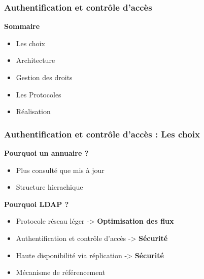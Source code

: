 \begin{frame}
  \frametitle{Authentification et contrôle d'accès}
  \begin{block}{\textbf{ Sommaire }}
  \begin{itemize}
  \item Les choix
  \item Architecture
  \item Gestion des droits
  \item Les Protocoles
  \item Réalisation
  \end{itemize}
  \end{block}
\end{frame}

\begin{frame}
  \frametitle{Authentification et contrôle d'accès : Les choix}
  \begin{block}{\textbf{Pourquoi un annuaire ? }}
  \begin{itemize}
  \item Plus consulté que mis à jour
  \item Structure hierachique 
  \end{itemize} 
  \end{block}
  
  \begin{block}{\textbf{Pourquoi LDAP ? }}
  \begin{itemize}
  \item Protocole réseau léger -> \textbf{Optimisation des flux
}
  \item Authentification et contrôle d'accès -> \textbf{Sécurité}
  \item Haute disponibilité via réplication  -> \textbf{Sécurité}
  \item Mécanisme de référencement
  \end{itemize}
  \end{block}
\end{frame}

